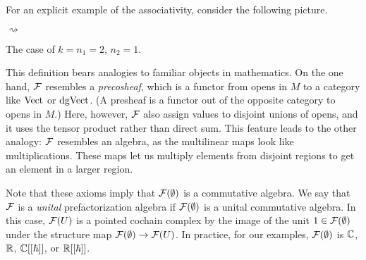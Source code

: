 \documentclass[11pt]{amsart}
\begin{document}
For an explicit example of the associativity, consider the following picture.
\begin{center}
\hspace{-1cm}
\begin{minipage}{3cm}
{\tiny
\begin{center}
\end{center}
}
 \end{minipage}
 \hspace{1.3cm} $\rightsquigarrow$ \hspace{-0.1cm}
\begin{minipage}{8cm}
\end{minipage}

The case of $k=n_1=2$, $n_2 = 1$.
\end{center}

This definition bears analogies to familiar objects in mathematics.
On the one hand, $\mathcal F$ resembles a {\em precosheaf}, which is a functor from opens in $M$ to a category like ${\rm Vect}$ or ${\rm dgVect}$.
(A presheaf is a functor out of the opposite category to opens in $M$.) 
Here, however, $\mathcal F$ also assign values to disjoint unions of opens, and it uses the tensor product rather than direct sum.
This feature leads to the other analogy: $\mathcal F$ resembles an algebra, as
the multilinear maps look like multiplications.
These maps let us multiply elements from disjoint regions to get an element in a larger region.

Note that these axioms imply that $\mathcal F(\emptyset)$ is a commutative algebra. 
We say that $\mathcal F$ is a \emph{unital} prefactorization algebra  if $\mathcal F(\emptyset)$ is a unital commutative algebra. In this case, $\mathcal F(U)$ is a pointed cochain complex by the image of the unit $1 \in \mathcal F(\emptyset)$ under the structure map $\mathcal F(\emptyset) \to \mathcal F(U)$. In practice, for our examples, $\mathcal F(\emptyset)$ is $\mathbb C$, $\mathbb R$, $\mathbb C[[\hbar]]$, or $\mathbb R[[\hbar]]$. 
\end{document}
